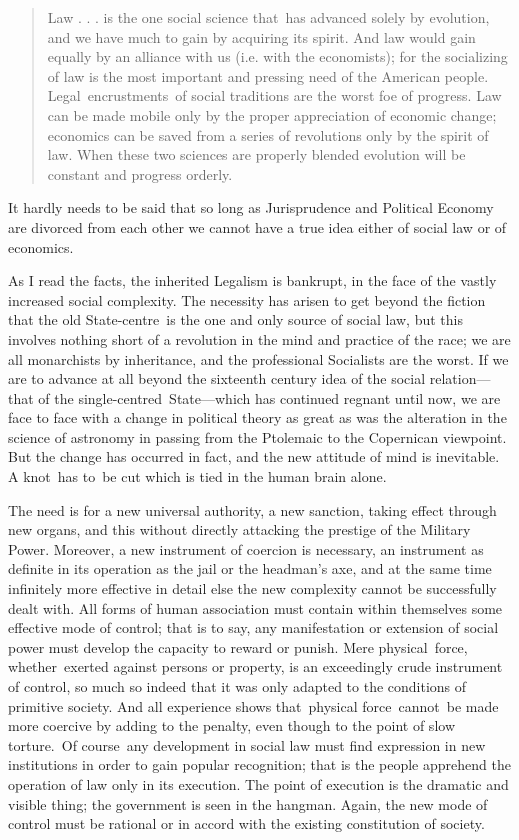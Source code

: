 \documentclass[openany,nobib]{tufte-book}
\begin{document}
\begin{quote}
Law . . . is the one social science that~has advanced solely by
evolution, and we have much to gain by acquiring its spirit. And law
would gain equally by an alliance with us (i.e. with the economists);
for the socializing of law is the most important and pressing need of
the American people. Legal~encrustments~of social traditions are the
worst foe of progress. Law can be made mobile only by the proper
appreciation of economic change; economics can be saved from a series of
revolutions only by the spirit of law. When these two sciences are
properly blended evolution will be constant and progress orderly.~
\end{quote}

It hardly needs to be said that so long as Jurisprudence and Political
Economy are divorced from each other we cannot have a true idea either
of social law or of economics.~

As I read the facts, the inherited Legalism is bankrupt, in the face of
the vastly increased social complexity. The necessity has arisen to get
beyond the fiction that the old State-centre~is the one and only source
of social law, but this involves nothing short of a revolution in the
mind and practice of the race; we are all monarchists by inheritance,
and the professional Socialists are the worst. If we are to advance at
all beyond the sixteenth century idea of the social relation---that of
the single-centred~State---which has continued regnant until now, we are
face to face with a change in political theory as great as was the
alteration in the science of astronomy in passing from the Ptolemaic to
the Copernican viewpoint. But the change has occurred in fact, and the
new attitude of mind is inevitable. A knot~has to~be cut which is tied
in the human brain alone.~

The need is for a new universal authority, a new sanction, taking effect
through new organs, and this without directly attacking the prestige of
the Military Power. Moreover, a new instrument of coercion is necessary,
an instrument as definite in its operation as the jail or the headman's
axe, and at the same time infinitely more effective in detail else the
new complexity cannot be successfully dealt with. All forms of human
association must contain within themselves some effective mode of
control; that is to say, any manifestation or extension of social power
must develop the capacity to reward or punish. Mere physical~force,
whether~exerted against persons or property, is an exceedingly crude
instrument of control, so much so indeed that it was only adapted to the
conditions of primitive society. And all experience shows that~physical
force~cannot~be made more coercive by adding to the penalty, even though
to the point of slow torture.~Of course~any development in social law
must find expression in new institutions in order to gain popular
recognition; that is the people apprehend the operation of law only in
its execution. The point of execution is the dramatic and visible thing;
the government is seen in the hangman. Again, the new mode of control
must be rational or in accord with the existing constitution of
society.~
\end{document}
